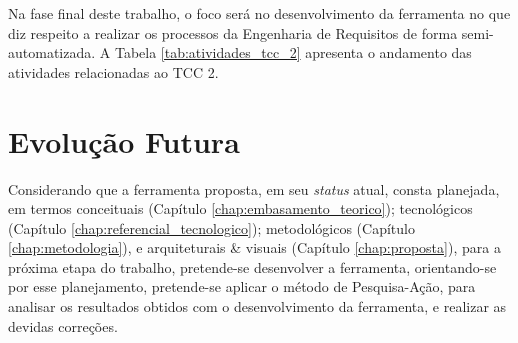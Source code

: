 Na fase final deste trabalho, o foco será no desenvolvimento da ferramenta no que diz respeito a realizar os processos da Engenharia de Requisitos de forma semi-automatizada. A Tabela \ref{tab:atividades_tcc_2} apresenta o andamento das atividades relacionadas ao TCC 2.

\begin{table}[H]
    \centering
    \caption{Andamento das atividades do TCC2}
    \label{tab:atividades_tcc_2}
\end{table}

\section{Evolução Futura}

\label{sec:evolucao_futura}

Considerando que a ferramenta proposta, em seu \textit{status} atual, consta planejada, em termos conceituais (Capítulo \ref{chap:embasamento_teorico}); tecnológicos (Capítulo \ref{chap:referencial_tecnologico}); metodológicos (Capítulo \ref{chap:metodologia}), e arquiteturais \& visuais (Capítulo \ref{chap:proposta}), para a próxima etapa do trabalho, pretende-se desenvolver a ferramenta, orientando-se por esse planejamento, pretende-se aplicar o método de Pesquisa-Ação, para analisar os resultados obtidos com o desenvolvimento da ferramenta, e realizar as devidas correções.